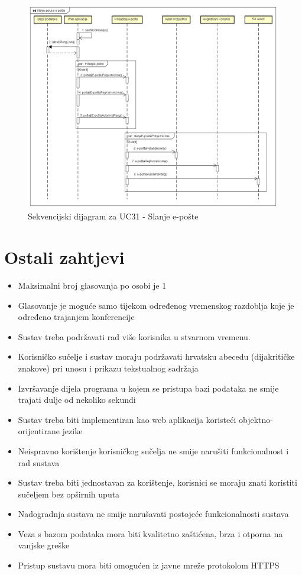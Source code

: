 				\begin{figure}[hp!]
					\includegraphics[width=\linewidth]{Slike/SD_SlanjeEPoste.png}
					\caption{Sekvencijski dijagram za UC31 - Slanje e-pošte}
				\end{figure}
				
				\newpage
				
				\eject
			
		\section{Ostali zahtjevi}
		
			 \begin{itemize}
			 	\item Maksimalni broj glasovanja po osobi je 1
			 	\item Glasovanje je moguće samo tijekom određenog vremenskog razdoblja koje je određeno trajanjem konferencije
			 	\item Sustav treba podržavati rad više korisnika u stvarnom vremenu.
			 	\item Korisničko sučelje i sustav moraju podržavati hrvatsku abecedu (dijakritičke
			 	znakove) pri unosu i prikazu tekstualnog sadržaja
			 	\item Izvršavanje dijela programa u kojem se pristupa bazi podataka ne smije trajati dulje od nekoliko sekundi
			 	\item Sustav treba biti implementiran kao web aplikacija koristeći objektno-orijentirane
			 	jezike
			 	\item Neispravno korištenje korisničkog sučelja ne smije narušiti funkcionalnost i rad sustava
			 	\item Sustav treba biti jednostavan za korištenje, korisnici se moraju znati koristiti sučeljem bez opširnih uputa
			 	\item Nadogradnja sustava ne smije narušavati postojeće funkcionalnosti sustava
			 	\item Veza s bazom podataka mora biti kvalitetno zaštićena, brza i otporna na vanjske greške
			 	\item Pristup sustavu mora biti omogućen iz javne mreže protokolom HTTPS
			 \end{itemize}
			 
			 
			 
	